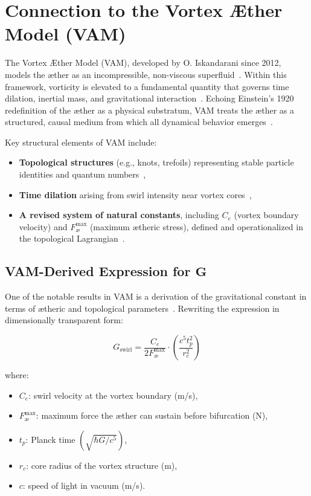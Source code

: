 \documentclass[preprint,notitlepage]{revtex4-2}
\begin{document}
\section{Connection to the Vortex Æther Model (VAM)}

The Vortex Æther Model (VAM), developed by O. Iskandarani since 2012, models the æther as an incompressible, non-viscous superfluid~\cite{VAM-8, VAM-13}. Within this framework, vorticity is elevated to a fundamental quantity that governs time dilation, inertial mass, and gravitational interaction~\cite{VAM-2, VAM-10, VAM-13}. Echoing Einstein’s 1920 redefinition of the æther as a physical substratum, VAM treats the æther as a structured, causal medium from which all dynamical behavior emerges~\cite{VAM-8}.

Key structural elements of VAM include:
\begin{itemize}
    \item \textbf{Topological structures} (e.g., knots, trefoils) representing stable particle identities and quantum numbers~\cite{VAM-8, VAM-11, VAM-14},
    \item \textbf{Time dilation} arising from swirl intensity near vortex cores~\cite{VAM-2, VAM-13},
    \item \textbf{A revised system of natural constants}, including $C_e$ (vortex boundary velocity) and $F^{\max}_{\text{\ae}}$ (maximum ætheric stress), defined and operationalized in the topological Lagrangian~\cite{VAM-14}.
\end{itemize}

\subsection*{VAM-Derived Expression for $\boldsymbol{G}$}

One of the notable results in VAM is a derivation of the gravitational constant in terms of ætheric and topological parameters~\cite{VAM-2, VAM-13, VAM-14}. Rewriting the expression in dimensionally transparent form:

\begin{equation}
    G_\text{swirl} = \frac{C_e}{2 F^{\max}_{\text{\ae}}} \cdot \left( \frac{c^5 t_p^2}{r_c^2} \right)
\end{equation}

\noindent where:
\begin{itemize}
    \item $C_e$: swirl velocity at the vortex boundary (m/s),
    \item $F^{\max}_{\text{\ae}}$: maximum force the æther can sustain before bifurcation (N),
    \item $t_p$: Planck time $ \left(\sqrt{\hbar G / c^5}\right) $,
    \item $r_c$: core radius of the vortex structure (m),
    \item $c$: speed of light in vacuum (m/s).
\end{itemize}
\end{document}
